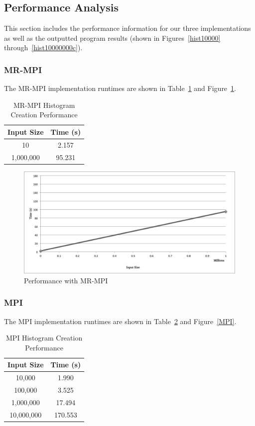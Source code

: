 \documentclass{acm_proc_article-sp}
\begin{document}
\clearpage

\subsection{Performance Analysis}
This section includes the performance information for our three implementations as well as the outputted program results (shown in Figures~\ref{hist10000} through~\ref{hist10000000c}).

\subsubsection{MR-MPI}
The MR-MPI implementation runtimes are shown in Table~\ref{MrMPITable} and Figure~\ref{MrMPI}.

\begin{table}[tbp]
\centering
\caption{MR-MPI Histogram Creation Performance}
\label{MrMPITable}
\begin{tabular}{ c || c }
	Input Size & Time (s) \\ \hline
    10 & 2.157 \\
    1,000,000 & 95.231 \\
\end{tabular}
\end{table}

\begin{figure}[tbp]
  \centering
  \caption{Performance with MR-MPI}
	\label{MrMPI}
  \includegraphics[width=40pc]{Pics/MrMPI.png}
\end{figure}

\subsubsection{MPI}
The MPI implementation runtimes are shown in Table~\ref{MPITable} and Figure~\ref{MPI}.

\begin{table}[tbp]
\centering
\caption{MPI Histogram Creation Performance}
\label{MPITable}
\begin{tabular}{ c || c }
	Input Size & Time (s) \\ \hline
    10,000 & 1.990 \\
    100,000 & 3.525 \\
    1,000,000 & 17.494 \\
    10,000,000 & 170.553 \\
\end{tabular}
\end{table}
\end{document}
